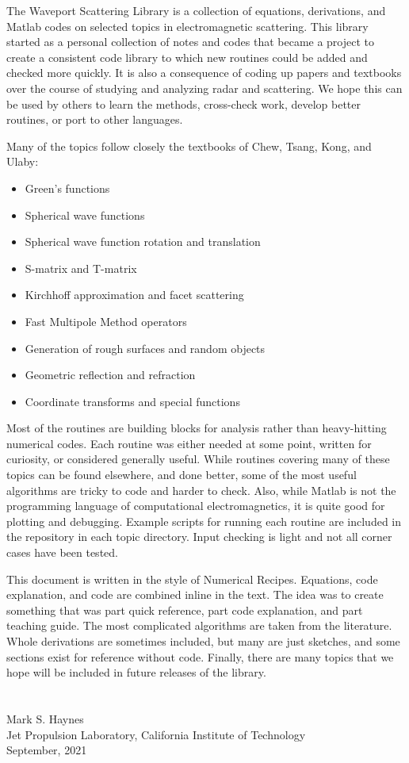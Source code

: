
The Waveport Scattering Library is a collection of equations, derivations, and Matlab codes on selected topics in electromagnetic scattering. This library started as a personal collection of notes and codes that became a project to create a consistent code library to which new routines could be added and checked more quickly. It is also a consequence of coding up papers and textbooks over the course of studying and analyzing radar and scattering. We hope this can be used by others to learn the methods, cross-check work, develop better routines, or port to other languages. 

Many of the topics follow closely the textbooks of Chew, Tsang, Kong, and Ulaby:
\begin{itemize}
  \setlength{\itemsep}{1pt}
  \setlength{\parskip}{0pt}
  \setlength{\parsep}{0pt}
\item Green's functions
\item Spherical wave functions
\item Spherical wave function rotation and translation
\item S-matrix and T-matrix
\item Kirchhoff approximation and facet scattering
\item Fast Multipole Method operators
\item Generation of rough surfaces and random objects
\item Geometric reflection and refraction
\item Coordinate transforms and special functions
\end{itemize}

Most of the routines are building blocks for analysis rather than heavy-hitting numerical codes. Each routine was either needed at some point, written for curiosity, or considered generally useful. While routines covering many of these topics can be found elsewhere, and done better, some of the most useful algorithms are tricky to code and harder to check. Also, while Matlab is not the programming language of computational electromagnetics, it is quite good for plotting and debugging. Example scripts for running each routine are included in the repository in each topic directory. Input checking is light and not all corner cases have been tested. 

This document is written in the style of Numerical Recipes. Equations, code explanation, and code are combined inline in the text. The idea was to create something that was part quick reference, part code explanation, and part teaching guide. The most complicated algorithms are taken from the literature. Whole derivations are sometimes included, but many are just sketches, and some sections exist for reference without code. Finally, there are many topics that we hope will be included in future releases of the library.  \\
\\
\\
Mark S. Haynes \\
Jet Propulsion Laboratory, California Institute of Technology \\
September, 2021 \\

